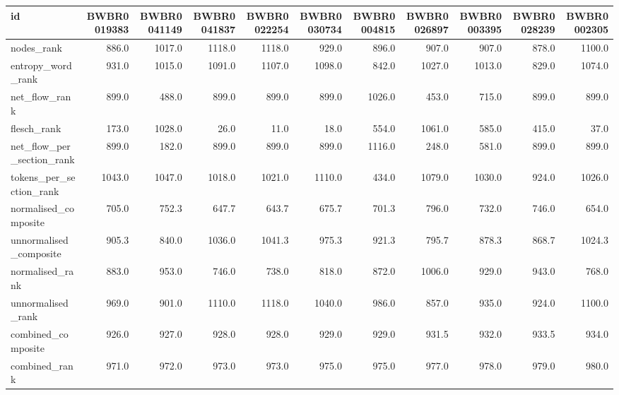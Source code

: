 \begin{tabular}{lrrrrrrrrrr}
\toprule
id & BWBR0019383 & BWBR0041149 & BWBR0041837 & BWBR0022254 & BWBR0030734 & BWBR0004815 & BWBR0026897 & BWBR0003395 & BWBR0028239 & BWBR0002305 \\
\midrule
nodes\_rank & 886.0 & 1017.0 & 1118.0 & 1118.0 & 929.0 & 896.0 & 907.0 & 907.0 & 878.0 & 1100.0 \\
\cline{1-11}
entropy\_word\_rank & 931.0 & 1015.0 & 1091.0 & 1107.0 & 1098.0 & 842.0 & 1027.0 & 1013.0 & 829.0 & 1074.0 \\
\cline{1-11}
net\_flow\_rank & 899.0 & 488.0 & 899.0 & 899.0 & 899.0 & 1026.0 & 453.0 & 715.0 & 899.0 & 899.0 \\
\cline{1-11}
flesch\_rank & 173.0 & 1028.0 & 26.0 & 11.0 & 18.0 & 554.0 & 1061.0 & 585.0 & 415.0 & 37.0 \\
\cline{1-11}
net\_flow\_per\_section\_rank & 899.0 & 182.0 & 899.0 & 899.0 & 899.0 & 1116.0 & 248.0 & 581.0 & 899.0 & 899.0 \\
\cline{1-11}
tokens\_per\_section\_rank & 1043.0 & 1047.0 & 1018.0 & 1021.0 & 1110.0 & 434.0 & 1079.0 & 1030.0 & 924.0 & 1026.0 \\
\cline{1-11}
normalised\_composite & 705.0 & 752.3 & 647.7 & 643.7 & 675.7 & 701.3 & 796.0 & 732.0 & 746.0 & 654.0 \\
\cline{1-11}
unnormalised\_composite & 905.3 & 840.0 & 1036.0 & 1041.3 & 975.3 & 921.3 & 795.7 & 878.3 & 868.7 & 1024.3 \\
\cline{1-11}
normalised\_rank & 883.0 & 953.0 & 746.0 & 738.0 & 818.0 & 872.0 & 1006.0 & 929.0 & 943.0 & 768.0 \\
\cline{1-11}
unnormalised\_rank & 969.0 & 901.0 & 1110.0 & 1118.0 & 1040.0 & 986.0 & 857.0 & 935.0 & 924.0 & 1100.0 \\
\cline{1-11}
combined\_composite & 926.0 & 927.0 & 928.0 & 928.0 & 929.0 & 929.0 & 931.5 & 932.0 & 933.5 & 934.0 \\
\cline{1-11}
combined\_rank & 971.0 & 972.0 & 973.0 & 973.0 & 975.0 & 975.0 & 977.0 & 978.0 & 979.0 & 980.0 \\
\cline{1-11}
\bottomrule
\end{tabular}
